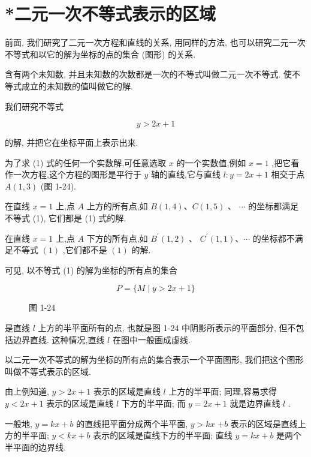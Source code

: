 \documentclass[lang=cn,newtx,12pt,scheme=chinese]{elegantbook}
\begin{document}
\section{*二元一次不等式表示的区域}

前面, 我们研究了二元一次方程和直线的关系, 用同样的方法, 也可以研究二元一次不等式和以它的解为坐标的点的集合 (图形) 的关系.

含有两个未知数, 并且未知数的次数都是一次的不等式叫做二元一次不等式. 使不等式成立的未知数的值叫做它的解.

我们研究不等式

\[
  y > {2x} + 1 \tag{1}
\]

的解, 并把它在坐标平面上表示出来.

为了求 (1) 式的任何一个实数解,可任意选取 \(x\) 的一个实数值,例如 \(x = 1\) ,把它看作一次方程,这个方程的图形是平行于 \(y\) 轴的直线,它与直线 \(l : y = {2x} + 1\) 相交于点 \(A\left( {1,3}\right)\) (图 1-24).

在直线 \(x = 1\) 上,点 \(A\) 上方的所有点,如 \(B\left( {1,4}\right) \text{、}C\left( {1,5}\right)\) 、 \(\cdots\) 的坐标都满足不等式 (1), 它们都是 (1) 式的解.

在直线 \(x = 1\) 上,点 \(A\) 下方的所有点,如 \({B}^{\prime }\left( {1,2}\right)\) 、 \({C}^{\prime }\left( {1,1}\right) \text{、}\cdots\) 的坐标都不满足不等式 \(\left( 1\right)\) ,它们都不是 \(\left( 1\right)\) 的解.

可见, 以不等式 (1) 的解为坐标的所有点的集合

\[
  P = \{ M \mid y > {2x} + 1\}
\]

\begin{figure}[h]
  \centering
  
  \caption{图 1-24}
\end{figure}

是直线 \(l\) 上方的半平面所有的点, 也就是图 1-24 中阴影所表示的平面部分, 但不包括边界直线. 这种情况,直线 \(l\) 在图中一般画成虚线.

以二元一次不等式的解为坐标的所有点的集合表示一个平面图形, 我们把这个图形叫做不等式表示的区域.

由上例知道, \(y > {2x} + 1\) 表示的区域是直线 \(l\) 上方的半平面; 同理,容易求得 \(y < {2x} + 1\) 表示的区域是直线 \(l\) 下方的半平面; 而 \(y = {2x} + 1\) 就是边界直线 \(l\) .

一般地, \(y = {kx} + b\) 的直线把平面分成两个半平面, \(y > {kx}\) \(+ b\) 表示的区域是直线上方的半平面; \(y < {kx} + b\) 表示的区域是直线下方的半平面; 直线 \(y = {kx} + b\) 是两个半平面的边界线.
\end{document}
